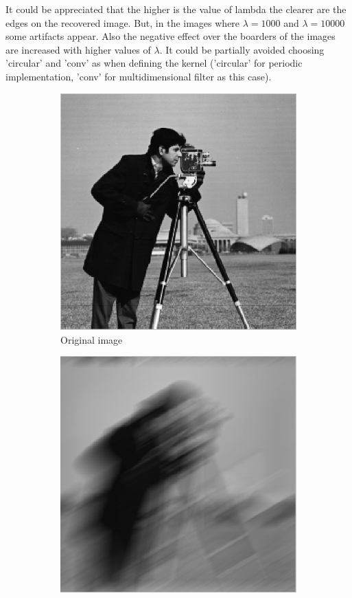 \documentclass[a4paper, 10pt, conference] {article}
\begin{document}
It could be appreciated that the higher is the value of lambda the clearer are the edges on the recovered image. But, in the images where $\lambda = 1000$ and $\lambda = 10000$ some artifacts appear. Also the negative effect over the boarders of the images are increased with higher values of $\lambda$. It could be partially avoided choosing 'circular' and 'conv' as when defining the kernel ('circular' for periodic implementation, 'conv' for multidimensional filter as this case).

\begin{figure}[H]
	\centering
	\begin{subfigure}{0.49\textwidth} 
		\centering						
		\includegraphics[scale=0.48]{gaussian/no_noise/original.PNG}
		\caption{Original image}
	\end{subfigure}
	\begin{subfigure}{0.49\textwidth}
		\centering
		\includegraphics[scale=0.48]{motion/no_noise/blured_len50_alpha30.PNG}

\end{subfigure}
\end{figure}
\end{document}
